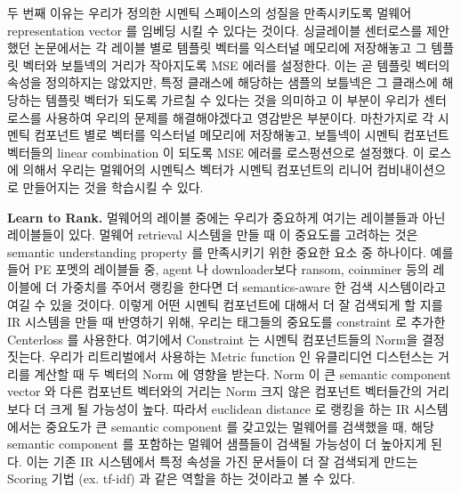 두 번째 이유는 우리가 정의한 시멘틱 스페이스의 성질을 만족시키도록 멀웨어 representation vector 를 임베딩 시킬 수 있다는 것이다. 싱글레이블 센터로스를 제안했던 논문에서는 각 레이블 별로 템플릿 벡터를 익스터널 메모리에 저장해놓고 그 템플릿 벡터와 보틀넥의 거리가 작아지도록 MSE 에러를 설정한다. 이는 곧 템플릿 벡터의 속성을 정의하지는 않았지만, 특정 클래스에 해당하는 샘플의 보틀넥은 그 클래스에 해당하는 템플릿 벡터가 되도록 가르칠 수 있다는 것을 의미하고 이 부분이 우리가 센터로스를 사용하여 우리의 문제를 해결해야겠다고 영감받은 부분이다. 마찬가지로 각 시멘틱 컴포넌트 별로 벡터를 익스터널 메모리에 저장해놓고, 보틀넥이 시멘틱 컴포넌트 벡터들의 linear combination 이 되도록 MSE 에러를 로스펑션으로 설정했다. 이 로스에 의해서 우리는 멀웨어의 시멘틱스 벡터가 시멘틱 컴포넌트의 리니어 컴비내이션으로 만들어지는 것을 학습시킬 수 있다. 


\textbf{Learn to Rank. }
멀웨어의 레이블 중에는 우리가 중요하게 여기는 레이블들과 아닌 레이블들이 있다. 멀웨어 retrieval 시스템을 만들 때 이 중요도를 고려하는 것은 semantic understanding property 를 만족시키기 위한 중요한 요소 중 하나이다. 예를 들어 PE 포멧의 레이블들 중, agent 나 downloader보다 ransom, coinminer 등의 레이블에 더 가중치를 주어서 랭킹을 한다면 더 semantics-aware 한 검색 시스템이라고 여길 수 있을 것이다. 이렇게 어떤 시멘틱 컴포넌트에 대해서 더 잘 검색되게 할 지를 IR 시스템을 만들 때 반영하기 위해, 우리는 태그들의 중요도를 constraint 로 추가한 Centerloss 를 사용한다. 여기에서 Constraint 는 시멘틱 컴포넌트들의 Norm을 결정짓는다. 우리가 리트리벌에서 사용하는 Metric function 인 유클리디언 디스턴스는 거리를 계산할 때 두 벡터의 Norm 에 영향을 받는다. Norm 이 큰 semantic component vector 와 다른 컴포넌트 벡터와의 거리는 Norm 크지 않은 컴포넌트 벡터들간의 거리보다 더 크게 될 가능성이 높다. 따라서 euclidean distance 로 랭킹을 하는 IR 시스템에서는 중요도가 큰 semantic component 를 갖고있는 멀웨어를 검색했을 때, 해당 semantic component 를 포함하는 멀웨어 샘플들이 검색될 가능성이 더 높아지게 된다. 이는 기존 IR 시스템에서 특정 속성을 가진 문서들이 더 잘 검색되게 만드는 Scoring 기법 (ex. tf-idf) 과 같은 역할을 하는 것이라고 볼 수 있다. 




